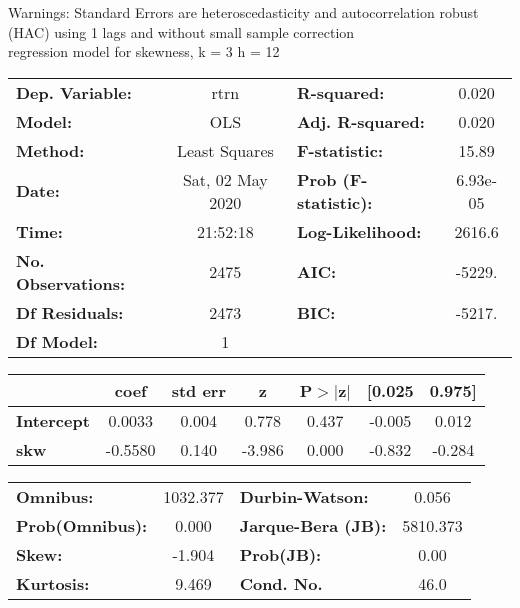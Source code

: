 Warnings: \newline
 [1] Standard Errors are heteroscedasticity and autocorrelation robust (HAC) using 1 lags and without small sample correction\\ 

regression model for skewness, k = 3 h = 12\begin{center}
\begin{tabular}{lclc}
\toprule
\textbf{Dep. Variable:}    &       rtrn       & \textbf{  R-squared:         } &     0.020   \\
\textbf{Model:}            &       OLS        & \textbf{  Adj. R-squared:    } &     0.020   \\
\textbf{Method:}           &  Least Squares   & \textbf{  F-statistic:       } &     15.89   \\
\textbf{Date:}             & Sat, 02 May 2020 & \textbf{  Prob (F-statistic):} &  6.93e-05   \\
\textbf{Time:}             &     21:52:18     & \textbf{  Log-Likelihood:    } &    2616.6   \\
\textbf{No. Observations:} &        2475      & \textbf{  AIC:               } &    -5229.   \\
\textbf{Df Residuals:}     &        2473      & \textbf{  BIC:               } &    -5217.   \\
\textbf{Df Model:}         &           1      & \textbf{                     } &             \\
\bottomrule
\end{tabular}
\begin{tabular}{lcccccc}
                   & \textbf{coef} & \textbf{std err} & \textbf{z} & \textbf{P$> |$z$|$} & \textbf{[0.025} & \textbf{0.975]}  \\
\midrule
\textbf{Intercept} &       0.0033  &        0.004     &     0.778  &         0.437        &       -0.005    &        0.012     \\
\textbf{skw}       &      -0.5580  &        0.140     &    -3.986  &         0.000        &       -0.832    &       -0.284     \\
\bottomrule
\end{tabular}
\begin{tabular}{lclc}
\textbf{Omnibus:}       & 1032.377 & \textbf{  Durbin-Watson:     } &    0.056  \\
\textbf{Prob(Omnibus):} &   0.000  & \textbf{  Jarque-Bera (JB):  } & 5810.373  \\
\textbf{Skew:}          &  -1.904  & \textbf{  Prob(JB):          } &     0.00  \\
\textbf{Kurtosis:}      &   9.469  & \textbf{  Cond. No.          } &     46.0  \\
\bottomrule
\end{tabular}
\end{center}

